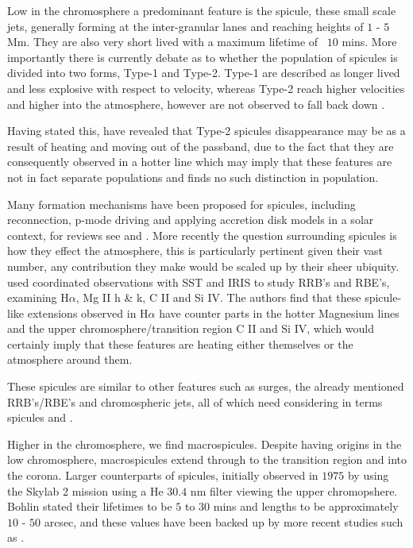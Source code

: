 \documentclass{emulateapj}
\begin{document}
Low in the chromosphere a predominant feature is the spicule, these small scale jets, generally forming at the inter-granular lanes and reaching heights of $1$ - $5$ Mm.
They are also very short lived with a maximum lifetime of ~$10$ mins.
More importantly there is currently debate as to whether the population of spicules is divided into two forms, Type-1 and Type-2. 
Type-1 are described as longer lived and less explosive with respect to velocity, whereas Type-2 reach higher velocities and higher into the atmosphere, however are not observed to fall back down \cite{DePontieu2007}. 

Having stated this, \cite{Pereira2014} have revealed that Type-2 spicules disappearance may be as a result of heating and moving out of the passband, due to the fact that they are consequently observed in a hotter line which may imply that these features are not in fact separate populations and \cite{Zhang2012} finds no such distinction in population.

Many formation mechanisms have been proposed for spicules, including reconnection, p-mode driving and applying accretion disk models in a solar context, for reviews see \cite{Sterling2000} and \cite{Zaqara_Erdelyi2009}.
More recently the question surrounding spicules is how they effect the atmosphere, this is particularly pertinent given their vast number, any contribution they make would be scaled up by their sheer ubiquity.
\cite{Rouppe2015} used coordinated observations with SST and IRIS to study RRB's and RBE's, examining H$\alpha$, Mg II h \& k, C II and Si IV.
The authors find that these spicule-like extensions observed in H$\alpha$ have counter parts in the hotter Magnesium lines and the upper chromosphere/transition region C II and Si IV, which would certainly imply that these features are heating either themselves or the atmosphere around them.

These spicules are similar to other features such as surges, the already mentioned RRB's/RBE's and chromospheric jets, all of which need considering in terms spicules \citep{Tsiropoula2012} and \citep{Kuridze2015}.


Higher in the chromosphere, we find macrospicules.
Despite having origins in the low chromosphere, macrospicules extend through to the transition region and into the corona. 
Larger counterparts of spicules, initially observed in $1975$ by \cite{Bohlin1975} using the Skylab 2 mission using a He $30.4$ nm filter viewing the upper chromopshere.
Bohlin stated their lifetimes to be $5$ to $30$ mins and lengths to be approximately $10$ - $50$ arcsec, and these values have been backed up by more recent studies such as \cite{Bennett2015}.
\end{document}
